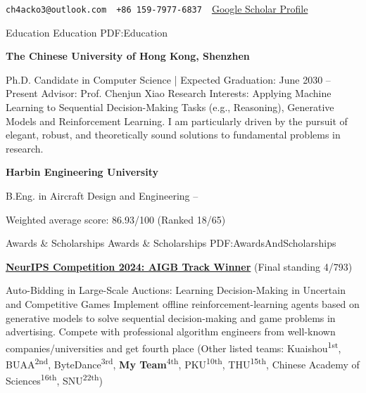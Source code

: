 \documentclass[letterpaper,MMMyyyy,nonstopmode]{simpleresumecv}
\newcommand{\CVAuthor}{Zhenrui Zheng}
\newcommand{\CVWebpage}{https://scholar.google.com/citations?user=KPpd1pYAAAAJ}
\begin{document}

\Title{\CVAuthor}

\begin{SubTitle}
 \texttt{ch4acko3@outlook.com}
\,\SubBulletSymbol\,
 \texttt{+86\,159-7977-6837}
\,\SubBulletSymbol\,
\href{\CVWebpage}
{ Google Scholar Profile}
\end{SubTitle}

\begin{Body}


\Section
{Education}
{Education}
{PDF:Education}

\Entry
\textbf{The Chinese University of Hong Kong, Shenzhen}

\Gap
\BulletItem
Ph.D. Candidate in Computer Science | Expected Graduation: June 2030
\hfill
{} --
Present
\BulletItem
Advisor: Prof. Chenjun Xiao
\SubBulletItem
Research Interests: Applying Machine Learning to Sequential Decision-Making Tasks (e.g., Reasoning), Generative Models and Reinforcement Learning. I am particularly driven by the pursuit of elegant, robust, and theoretically sound solutions to fundamental problems in research.

\BigGap

\Entry
\textbf{Harbin Engineering University}

\Gap
\BulletItem
B.Eng. in Aircraft Design and Engineering
\hfill
{} --
\begin{Detail}
\SubBulletItem
Weighted average score: 86.93/100 (Ranked 18/65)
\end{Detail}




\Section
{Awards \&\newline
Scholarships}
{Awards \& Scholarships}
{PDF:AwardsAndScholarships}

\BulletItem
\href{https://neurips.cc/virtual/2024/competition/84793}{\textbf{NeurIPS Competition 2024: AIGB Track Winner}} (Final standing 4/793)
\hfill
{}
\begin{Detail}
\Item
Auto-Bidding in Large-Scale Auctions: Learning Decision-Making in Uncertain and Competitive Games
\Item
Implement offline reinforcement-learning agents based on generative models to solve sequential decision-making and game problems in advertising. Compete with professional algorithm engineers from well-known companies/universities and get fourth place (Other listed teams: Kuaishou\textsuperscript{1st}, BUAA\textsuperscript{2nd}, ByteDance\textsuperscript{3rd}, \textbf{My Team}\textsuperscript{4th},  PKU\textsuperscript{10th}, THU\textsuperscript{15th}, Chinese Academy of Sciences\textsuperscript{16th}, SNU\textsuperscript{22th})
\end{Detail}


\end{Body}
\end{document}
